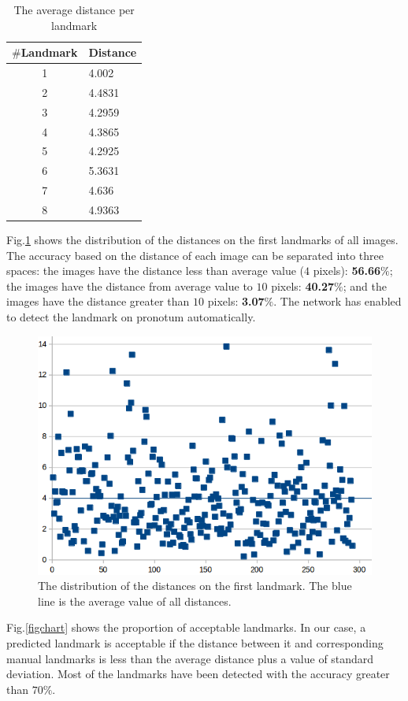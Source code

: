 \documentclass[conference]{IEEEtran}
\begin{document}
\begin{table}[htbp]
\caption{The average distance per landmark}
\begin{center}
\begin{tabular}{|c|p{1.5cm}|}
\hline
\textbf{$\#$Landmark} & \textbf{Distance} \\ \hline
1 & 4.002  \\ \hline
2 & 4.4831 \\ \hline
3 & 4.2959 \\ \hline
4 & 4.3865 \\ \hline
5 & 4.2925 \\ \hline
6 & 5.3631 \\ \hline
7 & 4.636 \\ \hline
8 & 4.9363 \\ \hline
\end{tabular}
\label{tab2}
\end{center}
\end{table}

Fig.\ref{figchartlm1} shows the distribution of the distances on the first landmarks of all images. The accuracy based on the distance of each image can be separated into three spaces: the images have the distance less than average value ($4$ pixels): \textbf{56.66$\%$}; the images have the distance from average value to $10$ pixels: \textbf{40.27$\%$}; and the images have the distance greater than $10$ pixels: \textbf{3.07$\%$}. The network has enabled to detect the landmark on pronotum automatically. %

\begin{figure}[htbp]
	\centerline{\includegraphics[scale=0.3]{images/statistic}}
	\caption{The distribution of the distances on the first landmark. The blue line is the average value of all distances.}
	\label{figchartlm1}
\end{figure}
Fig.\ref{figchart} shows the proportion of acceptable landmarks. In our case, a predicted landmark is acceptable if the distance between it and corresponding manual landmarks is less than the average distance plus a value of standard deviation. Most of the landmarks have been detected with the accuracy greater than $70\%$. %
\end{document}
